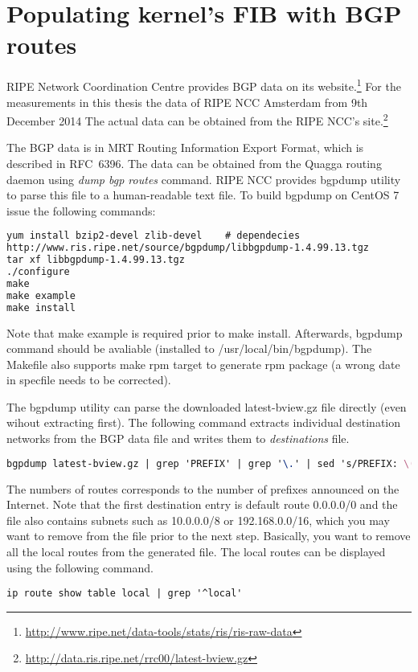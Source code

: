 
\chapter{Populating kernel's FIB with BGP routes}\label{app:bgp}
RIPE Network Coordination Centre provides BGP data on its
website.\footnote{{\url{http://www.ripe.net/data-tools/stats/ris/ris-raw-data}}}
For the measurements in this thesis the data of RIPE NCC Amsterdam from 9th December 2014
The actual data can be obtained from the RIPE NCC's
site.\footnote{{\url{http://data.ris.ripe.net/rrc00/latest-bview.gz}}}

The BGP data is in MRT Routing Information Export Format, which is described in RFC~6396.
The data can be obtained from the Quagga routing daemon
using {\it{dump bgp routes}} command.
RIPE NCC provides bgpdump utility to parse this file to a human-readable text file.
To build bgpdump on CentOS 7 issue the following commands:
\begin{lstlisting}[language=TeX]
yum install bzip2-devel zlib-devel    # dependecies
http://www.ris.ripe.net/source/bgpdump/libbgpdump-1.4.99.13.tgz
tar xf libbgpdump-1.4.99.13.tgz
./configure
make
make example
make install
\end{lstlisting}
Note that make example is required prior to make install.
Afterwards, bgpdump command should be avaliable (installed to /usr/local/bin/bgpdump).
The Makefile also supports make rpm target to generate rpm package (a wrong date in specfile needs to be corrected).

The bgpdump utility can parse the downloaded latest-bview.gz file directly (even wihout extracting first).
The following command extracts individual destination networks from the BGP data file and writes them to {\it{destinations}} file.
\begin{lstlisting}[language=TeX]
bgpdump latest-bview.gz | grep 'PREFIX' | grep '\.' | sed 's/PREFIX: \(.*\)/\1/' | grep -v '0.0.0.0/0' | uniq > destinations
\end{lstlisting}
The numbers of routes corresponds to the number of prefixes announced on the Internet.
Note that the first destination entry is default route 0.0.0.0/0 and the file also contains subnets such as 10.0.0.0/8 or 192.168.0.0/16,
which you may want to remove from the file prior to the next step.
Basically, you want to remove all the local routes from the generated file.
The local routes can be displayed using the following command.
\begin{lstlisting}
ip route show table local | grep '^local'
\end{lstlisting}

